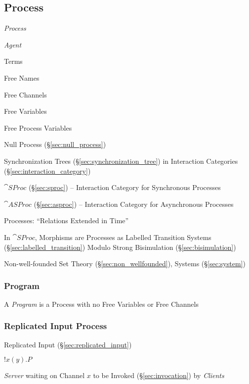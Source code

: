 \subsection{Process}\label{sec:process}

\emph{Process}

\emph{Agent}

Terms

Free Names

Free Channels

Free Variables

Free Process Variables

Null Process (\S\ref{sec:null_process})


\asterism


Synchronization Trees (\S\ref{sec:synchronization_tree}) in
Interaction Categories (\S\ref{sec:interaction_category})

$\cat{SProc}$ (\S\ref{sec:sproc}) -- Interaction Category for
Synchronous Processes

$\cat{ASProc}$ (\S\ref{sec:asproc}) -- Interaction Category for
Asynchronous Processes

Processes: ``Relations Extended in Time''

In $\cat{SProc}$, Morphisms are Processes as Labelled Transition
Systems (\S\ref{sec:labelled_transition}) Modulo Strong Bisimulation
(\S\ref{sec:bisimulation})

Non-well-founded Set Theory (\S\ref{sec:non_wellfounded}), Systems
(\S\ref{sec:system})



\subsubsection{Program}\label{sec:program}

A \emph{Program} is a Process with no Free Variables or Free Channels



\subsubsection{Replicated Input Process}
\label{sec:replicated_input_process}

Replicated Input (\S\ref{sec:replicated_input})

$!x(y).P$

\emph{Server} waiting on Channel $x$ to be Invoked
(\S\ref{sec:invocation}) by \emph{Clients}



